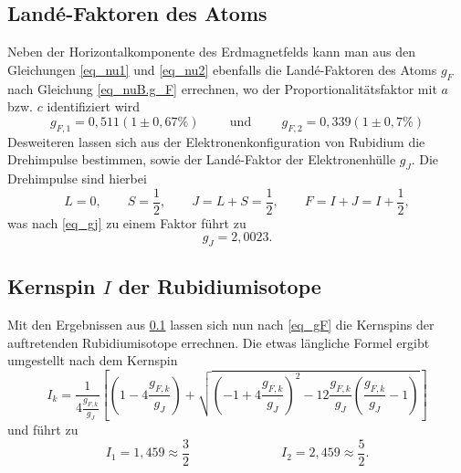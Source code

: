 \subsection{Landé-Faktoren des Atoms}
\label{sec_lande}
Neben der Horizontalkomponente des Erdmagnetfelds kann man aus den Gleichungen \eqref{eq_nu1} und \eqref{eq_nu2} ebenfalls die Landé-Faktoren des
Atoms $g_F$ nach Gleichung \eqref{eq_nuB.g_F} errechnen, wo der Proportionalitätsfaktor mit $a$ bzw. $c$ identifiziert wird
\begin{equation}
 g_{F,1} = 0,511(1 \pm 0,67\%) \hspace{1cm}\text{und}\hspace{1cm}g_{F,2} = 0,339(1\pm 0,7\%) 
\end{equation}
Desweiteren lassen sich aus der Elektronenkonfiguration von Rubidium \cite{EKonf} die Drehimpulse bestimmen, sowie der Landé-Faktor der Elektronenhülle $g_J$.
Die Drehimpulse sind hierbei
\begin{equation}
 L = 0 , \qquad S=\frac12 , \qquad J = L+S = \frac12, \qquad F = I+J= I + \frac12,
\end{equation}
was nach \eqref{eq_gj} zu einem Faktor führt zu
\begin{equation}
 g_J = 2,0023. 
\end{equation}

\subsection{Kernspin $I$ der Rubidiumisotope}
Mit den Ergebnissen aus \ref{sec_lande} lassen sich nun nach \eqref{eq_gF} die Kernspins der auftretenden Rubidiumisotope errechnen. Die etwas
längliche Formel ergibt umgestellt nach dem Kernspin
\begin{equation}
 I_k = \frac{1}{4\frac{g_{F,k}}{g_J}} \left[\left(1-4\frac{g_{F,k}}{g_J}\right) + \sqrt{\left(-1+4\frac{g_{F,k}}{g_J}\right)^2-12\frac{g_{F,k}}{g_J}\left(\frac{g_{F,k}}{g_J}-1\right)}\right]
\end{equation}
und führt zu
\begin{equation}
 I_1 = 1,459 \approx \frac32 \hspace{3cm} I_2=	2,459 \approx \frac52.
\end{equation}

